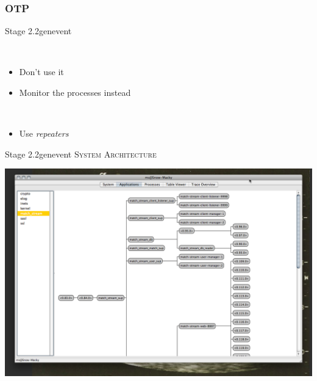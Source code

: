 \documentclass[utf8]{beamer}
\begin{document}
\subsubsection{OTP}
\begin{frame}{Stage 2.2}{gen\textunderscore event}
	\begin{description}
		\item<+->[sup\textunderscore handler]\ \\
			\begin{itemize}
				\item Don't use it
				\item Monitor the processes instead
			\end{itemize}
		\item<+->[Long Delivery Queues]\ \\
			\begin{itemize}
				\item Use \emph{repeaters}
			\end{itemize}
	\end{description}
\end{frame}
\begin{frame}{Stage 2.2}{gen\textunderscore event}
	\textsc{System Architecture}
	\begin{center}
		\includegraphics[height=.75\textheight]{img/running-late.png}
	\end{center}
\end{frame}
\end{document}

